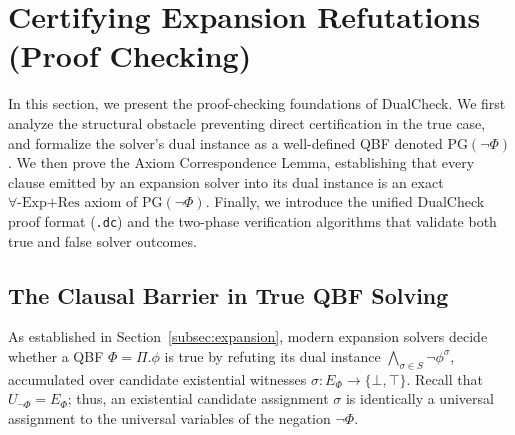 \documentclass[runningheads]{llncs}
\newcommand{\Bool}{\{\bot,\top\}}
\newcommand{\ExpRes}{\forall\text{-}\mathrm{Exp}\text{+}\mathrm{Res}}
\newcommand{\PG}{\mathrm{PG}}
\begin{document}

\section{Certifying Expansion Refutations (Proof Checking)}
\label{sec:checking}

In this section, we present the proof-checking foundations of DualCheck.
We first analyze the structural obstacle preventing direct certification in the true case, and formalize the solver's dual instance as a well-defined QBF denoted $\PG(\neg\Phi)$.
We then prove the Axiom Correspondence Lemma, establishing that every clause emitted by an expansion solver into its dual instance is an exact $\ExpRes$ axiom of $\PG(\neg\Phi)$.
Finally, we introduce the unified DualCheck proof format (\texttt{.dc}) and the two-phase verification algorithms that validate both true and false solver outcomes.

\subsection{The Clausal Barrier in True QBF Solving}
\label{subsec:barrier}

As established in Section~\ref{subsec:expansion}, modern expansion solvers decide whether a QBF $\Phi = \Pi.\phi$ is true by refuting its dual instance $\bigwedge_{\sigma \in S} \neg\phi^\sigma$, accumulated over candidate existential witnesses $\sigma : E_\Phi \to \Bool$.
Recall that $U_{\neg\Phi} = E_\Phi$; thus, an existential candidate assignment $\sigma$ is identically a universal assignment to the universal variables of the negation $\neg\Phi$.
\end{document}
